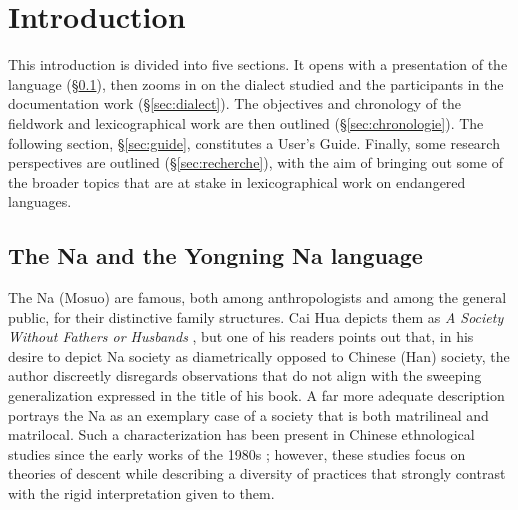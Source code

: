 \langueeng

\chapter*{Introduction}

This introduction is divided into five sections. It opens with a presentation of the language (§\ref{sec:lang}), then zooms in on the dialect studied and the participants in the documentation work (§\ref{sec:dialect}). The objectives and chronology of the fieldwork and lexicographical work are then outlined (§\ref{sec:chronologie}). The following section, §\ref{sec:guide}, constitutes a User's Guide. Finally, some research perspectives are outlined (§\ref{sec:recherche}), with the aim of bringing out some of the broader topics that are at stake in lexicographical work on endangered languages.

\section{The Na and the Yongning Na language}
\label{sec:lang}

The Na (Mosuo) are famous, both among anthropologists and among the general public, for their distinctive family structures. Cai Hua depicts them as \emph{A Society Without Fathers or Husbands} \parencite{cai1997}, but one of his readers \parencite[147]{wellens2003} points out that, in his desire to depict Na society as diametrically opposed to Chinese (Han) society, the author discreetly disregards observations that do not align with the sweeping generalization expressed in the title of his book. A far more adequate description portrays the Na as an exemplary case of a society that is both matrilineal and matrilocal. Such a characterization has been present in Chinese ethnological studies since the early works of the 1980s \parencite{zhanetal1980,yanetal1983,weng1993,shih1993,shih2010}; however, these studies focus on theories of descent while describing a diversity of practices that strongly contrast with the rigid interpretation given to them.

